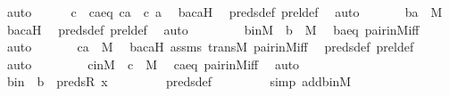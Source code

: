 \begin{isabellebody}
\ auto\isanewline
\ \ \ \ \isamarkupfalse%
\ c\ \ caeq{\isacharcolon}{\kern0pt}\ {\isachardoublequoteopen}ca\ {\isacharequal}{\kern0pt}\ {\isacharless}{\kern0pt}c{\isacharcomma}{\kern0pt}\ a{\isachargreater}{\kern0pt}{\isachardoublequoteclose}\ \isamarkupfalse%
\ bacaH\ \isamarkupfalse%
\ preds{\isacharunderscore}{\kern0pt}def\ prel{\isacharunderscore}{\kern0pt}def\ \isamarkupfalse%
\ auto\ \isanewline
\isanewline
\ \ \ \ \isamarkupfalse%
\ {\isachardoublequoteopen}ba\ {\isasymin}\ M{\isachardoublequoteclose}\ \isamarkupfalse%
\ bacaH\ \isamarkupfalse%
\ preds{\isacharunderscore}{\kern0pt}def\ prel{\isacharunderscore}{\kern0pt}def\ \isamarkupfalse%
\ auto\ \isanewline
\ \ \ \ \isamarkupfalse%
\ \isamarkupfalse%
\ binM\ {\isacharcolon}{\kern0pt}\ {\isachardoublequoteopen}b\ {\isasymin}\ M{\isachardoublequoteclose}\ \isamarkupfalse%
\ baeq\ pair{\isacharunderscore}{\kern0pt}in{\isacharunderscore}{\kern0pt}M{\isacharunderscore}{\kern0pt}iff\ \isamarkupfalse%
\ auto\ \isanewline
\ \ \ \ \isamarkupfalse%
\ {\isachardoublequoteopen}ca\ {\isasymin}\ M{\isachardoublequoteclose}\ \isamarkupfalse%
\ bacaH\ assms\ transM\ pair{\isacharunderscore}{\kern0pt}in{\isacharunderscore}{\kern0pt}M{\isacharunderscore}{\kern0pt}iff\ \isamarkupfalse%
\ preds{\isacharunderscore}{\kern0pt}def\ prel{\isacharunderscore}{\kern0pt}def\ \isamarkupfalse%
\ auto\ \isanewline
\ \ \ \ \isamarkupfalse%
\ \isamarkupfalse%
\ cinM\ {\isacharcolon}{\kern0pt}\ {\isachardoublequoteopen}c\ {\isasymin}\ M{\isachardoublequoteclose}\ \isamarkupfalse%
\ caeq\ pair{\isacharunderscore}{\kern0pt}in{\isacharunderscore}{\kern0pt}M{\isacharunderscore}{\kern0pt}iff\ \isamarkupfalse%
\ auto\ \isanewline
\isanewline
\ \ \ \ \isamarkupfalse%
\ bin\ {\isacharcolon}{\kern0pt}\ {\isachardoublequoteopen}b\ {\isasymin}\ preds{\isacharparenleft}{\kern0pt}R{\isacharcomma}{\kern0pt}\ x{\isacharparenright}{\kern0pt}{\isachardoublequoteclose}\ \isanewline
\ \ \ \ \ \ \isamarkupfalse%
\ preds{\isacharunderscore}{\kern0pt}def\ \isanewline
\ \ \ \ \ \ \isamarkupfalse%
\ {\isacharparenleft}{\kern0pt}simp\ add{\isacharcolon}{\kern0pt}binM{\isacharparenright}{\kern0pt}\isanewline
\ \ \ \ \ \ \isamarkupfalse%

\end{isabellebody}

